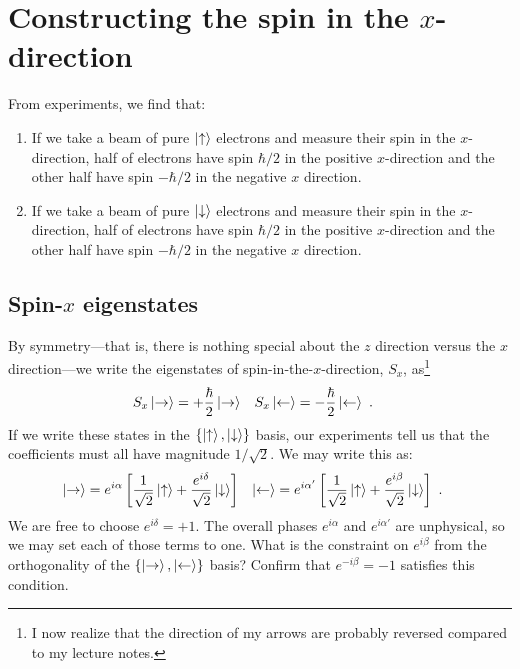 \documentclass[12pt, oneside]{report}    %
\let\oldsection\section
\def\section{%
  \setcounter{sidenote}{1}%
  \oldsection
}
\begin{document}
\section{Constructing the spin in the $x$-direction}

From experiments, we find that: 
\begin{enumerate}
    \item If we take a beam of pure $\left|\uparrow\right\rangle$ electrons and measure their spin in the $x$-direction, half of electrons have spin $\hbar/2$ in the positive $x$-direction and the other half have spin $-\hbar/2$ in the negative $x$ direction. 
    \item If we take a beam of pure $\left|\downarrow\right\rangle$ electrons and measure their spin in the $x$-direction, half of electrons have spin $\hbar/2$ in the positive $x$-direction and the other half have spin $-\hbar/2$ in the negative $x$ direction. 
\end{enumerate}

\subsection{Spin-$x$ eigenstates}
By symmetry---that is, there is nothing special about the $z$ direction versus the $x$ direction---we write the eigenstates of spin-in-the-$x$-direction, $S_x$, as\footnote{I now realize that the direction of my arrows are probably reversed compared to my lecture notes.}
\begin{align}
    S_x\left|\rightarrow\right\rangle &= + \frac{\hbar}{2}\left|\rightarrow\right\rangle 
    &
    S_x\left|\leftarrow\right\rangle &= - \frac{\hbar}{2}\left|\leftarrow\right\rangle \ .
\end{align}
If we write these states in the $\{\left|\uparrow\right\rangle,\left|\downarrow\right\rangle\}$ basis, our experiments tell us that the coefficients must all have magnitude $1/\sqrt{2}$. We may write this as:
\begin{align}
    \left|\rightarrow\right\rangle &= 
    e^{i\alpha}\left[\frac{1}{\sqrt{2}}\left|\uparrow\right\rangle + \frac{e^{i\delta}}{\sqrt{2}}\left|\downarrow\right\rangle \right]
    &
    \left|\leftarrow\right\rangle &= 
    e^{i\alpha'}\left[\frac{1}{\sqrt{2}}\left|\uparrow\right\rangle + \frac{e^{i\beta}}{\sqrt{2}}\left|\downarrow\right\rangle \right]
    \ .
\end{align}
We are free to choose $e^{i\delta} = +1$. The overall phases $e^{i\alpha}$ and $e^{i\alpha'}$ are unphysical, so we may set each of those terms to one. What is the constraint on $e^{i\beta}$ from the orthogonality of the $\{\left|\rightarrow\right\rangle, \left|\leftarrow\right\rangle\}$ basis? Confirm that $e^{-i\beta}=-1$ satisfies this condition. 
\end{document}
